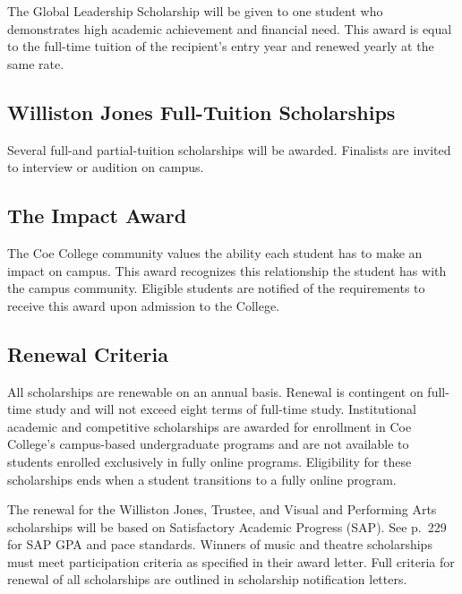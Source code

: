 \documentclass[
  letterpaper,
]{scrbook}
\begin{document}
The Global Leadership Scholarship will be given to one student who
demonstrates high academic achievement and financial need. This award is
equal to the full-time tuition of the recipient's entry year and renewed
yearly at the same rate.

\subsection{\texorpdfstring{\textbf{Williston Jones Full-Tuition
Scholarships}}{Williston Jones Full-Tuition Scholarships}}\label{williston-jones-full-tuition-scholarships}

Several full-and partial-tuition scholarships will be awarded. Finalists
are invited to interview or audition on campus.

\subsection{\texorpdfstring{\textbf{The Impact
Award}}{The Impact Award}}\label{the-impact-award}

The Coe College community values the ability each student has to make an
impact on campus. This award recognizes this relationship the student
has with the campus community. Eligible students are notified of the
requirements to receive this award upon admission to the College.

\subsection{\texorpdfstring{\textbf{Renewal
Criteria}}{Renewal Criteria}}\label{renewal-criteria}

All scholarships are renewable on an annual basis. Renewal is contingent
on full-time study and will not exceed eight terms of full-time study.
Institutional academic and competitive scholarships are awarded for
enrollment in Coe College's campus-based undergraduate programs and are
not available to students enrolled exclusively in fully online programs.
Eligibility for these scholarships ends when a student transitions to a
fully online program.

The renewal for the Williston Jones, Trustee, and Visual and Performing
Arts scholarships will be based on Satisfactory Academic Progress (SAP).
See p.~229 for SAP GPA and pace standards. Winners of music and theatre
scholarships must meet participation criteria as specified in their
award letter. Full criteria for renewal of all scholarships are outlined
in scholarship notification letters.
\end{document}
